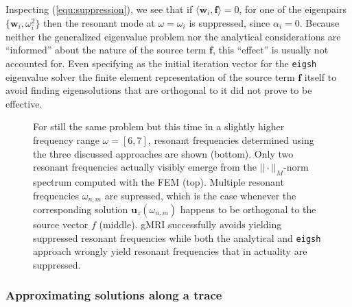 \documentclass[11pt, a4paper]{article}
\begin{document}
Inspecting (\ref{equ:suppression}), we see that if $\langle \mathbf{w}_i, \mathbf{f} \rangle = 0$,
for one of the eigenpairs $\{\mathbf{w}_i, \omega_i^2\}$ then the resonant mode
at $\omega = \omega_i$ is suppressed, since $\alpha_i=0$. Because neither the
generalized eigenvalue problem nor the analytical considerations
are \enquote{informed} about the nature of the source term $\mathbf{f}$, this \enquote{effect}
is usually not accounted for. Even specifying as the initial iteration vector for
the \texttt{eigsh} eigenvalue solver the finite element representation of the
source term $\mathbf{f}$ itself to avoid finding
eigensolutions that are orthogonal to it did not prove to be effective.
\begin{figure}[ht]
    \centering
    
    \caption{For still the same problem but this time in a slightly higher
    frequency range $\omega = [6, 7]$, resonant frequencies determined using the
    three discussed approaches are shown (bottom). Only two resonant
    frequencies actually visibly emerge from the $||\cdot||_M$-norm spectrum computed
    with the \acrshort{FEM} (top). Multiple resonant
    frequencies $\omega_{n, m}$ are supressed, which is the case whenever the corresponding
    solution $\mathbf{u}_z(\omega_{n, m})$ happens to be orthogonal to the source vector $f$ (middle).
    \acrshort{gMRI} successfully avoids yielding suppressed resonant frequencies
    while both the analytical and \texttt{eigsh} approach wrongly yield
    resonant frequencies that in actuality are suppressed.}
    \label{fig:rectangular-cavity-suppression}
\end{figure}

\clearpage
\subsubsection{Approximating solutions along a trace}
\label{subsubsec:traces}
\end{document}
